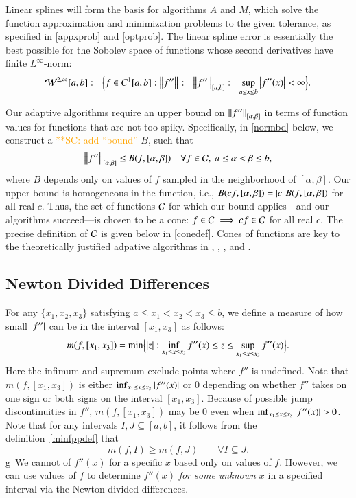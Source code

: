 \documentclass[review]{elsarticle}
\newcommand{\scnote}[1]{ {\textcolor{orange}  {**SC: #1}}}
\begin{document}
Linear splines will form the basis for algorithms $A$ and $M$, which solve the
function approximation and minimization problems to the given tolerance, as
specified in \eqref{appxprob} and \eqref{optprob}. The linear spline error is
essentially the best possible for the Sobolev space of functions whose second
derivatives have finite $L^{\infty}$-norm:
\[
\cw^{2,\infty}[a,b] : = \Bigl \{f \in C^1[a,b] : \norm{f''} : = \norm[{[a,b]}]{f''} : = \sup_{a \le x \le b} \abs{f''(x)} <  \infty \Bigr\}.
\]

Our adaptive algorithms require an upper bound on $\norm[{[\alpha,
\beta]}]{f''}$ in terms of function values for functions that are not too spiky.
Specifically, in \eqref{normbd} below, we construct a \scnote{add ``bound''} $B$, such that
\[
\norm[{[\alpha, \beta]}]{f''} \le B(f,[\alpha,\beta]) \quad \forall f \in \cc, \ a \le \alpha < \beta \le b,
\]
where $B$ depends only on values of $f$ sampled in the neighborhood of $[\alpha,
\beta]$. Our upper bound is homogeneous in the function, i.e.,
$B(cf,[\alpha,\beta]) = \abs{c} B(f,[\alpha,\beta])$ for all real $c$. Thus, the
set of functions $\cc$ for which our bound applies---and our algorithms
succeed---is chosen to be a cone: $f \in \cc \implies cf \in \cc$ for all real
$c$. The precise definition of $\cc$ is given below in \eqref{conedef}. Cones of
functions are key to the theoretically justified adpative algorithms in
\cite{HicEtal14b}, \cite{Ton14a}, \cite{Din15a}, and \cite{HicRazYun15a}.

\subsection{Newton Divided Differences} \label{sec:ndd}

For any $\{x_1, x_2, x_3\}$ satisfying $a \le x_1 < x_2 < x_3 \le b$, we define a
measure of how small $\abs{f''}$ can be in the interval $[x_1, x_3]$ as follows:
\begin{equation} \label{minfppdef}
m(f,[x_1, x_3]) = \min \Bigl\{ \abs{z}  : \inf_{x_1 \le x \le x_3} f''(x) \le z \le \sup_{x_1 \le x \le x_3} f''(x) \Bigr\}.
\end{equation}
Here the infimum and supremum exclude points where $f''$ is undefined. Note that
$m(f,[x_1, x_3])$ is either $ \inf_{x_1 \le x \le x_3} \abs{f''(x)}$ or $0$
depending on whether $f''$ takes on one sign or both signs on the interval
$[x_1, x_3]$. Because of possible jump discontinuities in $f''$, $m(f,[x_1,
x_3])$ may be $0$ even when $\inf_{x_1 \le x \le x_3} \abs{f''(x)} > 0$. Note
that for any intervals $I , J \subseteq [a,b]$, it follows from the definition~\eqref{minfppdef}
that
\begin{equation} \label{mdec}
m(f,I) \ge m(f,J) \qquad \forall I \subseteq J.
\end{equation}
 g\
We cannot of $f''(x)$ for a specific $x$ based only on values of $f$. However,
we can use values of $f$ to determine $f''(x)$ \emph{for some unknown $x$} in a
specified interval via the Newton divided differences.
\end{document}
